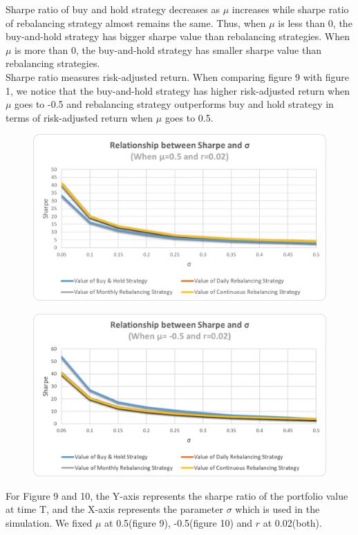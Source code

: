 \documentclass[
10pt, %
a4paper, %
oneside, %
headinclude,footinclude, %
BCOR5mm, %
]{scrartcl}
\begin{document}
Sharpe ratio of buy and hold strategy decreases as $\mu$ increases while sharpe ratio of rebalancing strategy almost remains the same. Thus, when $\mu$ is less than 0, the buy-and-hold strategy has bigger sharpe value than rebalancing strategies. When $\mu$ is more than 0, the buy-and-hold strategy has smaller sharpe value than rebalancing strategies. \\

Sharpe ratio measures risk-adjusted return. When comparing figure 9 with figure 1, we notice that the buy-and-hold strategy has higher risk-adjusted return when $\mu$ goes to -0.5 and rebalancing strategy outperforms buy and hold strategy in terms of risk-adjusted return when $\mu$ goes to 0.5.


\begin{figure}[H]
	\centering
	\includegraphics[width=0.7\linewidth]{sharpe_sigma_050_002}
	\caption{}
	\label{fig:sharpesigma050002}
\end{figure}

\begin{figure}[H]
	\centering
	\includegraphics[width=0.7\linewidth]{sharpe_sigma_-050_002}
	\caption{}
	\label{fig:sharpesigma-050002}
\end{figure}
For Figure 9 and 10, the Y-axis represents the sharpe ratio of the portfolio value at time T, and the X-axis represents the parameter $\sigma$ which is used in the simulation. We fixed $\mu$ at 0.5(figure 9), -0.5(figure 10) and $r$ at 0.02(both).\\
\end{document}
